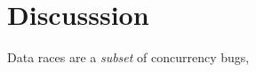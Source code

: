 \section{Discusssion}
\label{s:discussion}

%

Data races are a \textit{subset} of concurrency bugs, 

\PP{}
%

